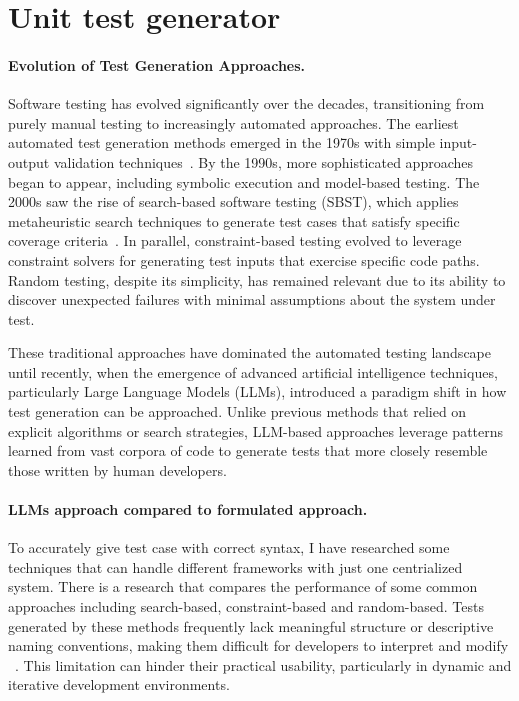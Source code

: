
\section{Unit test generator}

\paragraph{Evolution of Test Generation Approaches.} Software testing has evolved significantly over the decades, transitioning from purely manual testing to increasingly automated approaches. The earliest automated test generation methods emerged in the 1970s with simple input-output validation techniques~\cite{TestHistory}. By the 1990s, more sophisticated approaches began to appear, including symbolic execution and model-based testing. The 2000s saw the rise of search-based software testing (SBST), which applies metaheuristic search techniques to generate test cases that satisfy specific coverage criteria~\cite{SearchBasedSurvey}. In parallel, constraint-based testing evolved to leverage constraint solvers for generating test inputs that exercise specific code paths. Random testing, despite its simplicity, has remained relevant due to its ability to discover unexpected failures with minimal assumptions about the system under test.

\hspace{0.5cm} These traditional approaches have dominated the automated testing landscape until recently, when the emergence of advanced artificial intelligence techniques, particularly Large Language Models (LLMs), introduced a paradigm shift in how test generation can be approached. Unlike previous methods that relied on explicit algorithms or search strategies, LLM-based approaches leverage patterns learned from vast corpora of code to generate tests that more closely resemble those written by human developers.

\paragraph{LLMs approach compared to formulated approach.} To accurately give test case with correct syntax, I have researched some techniques that can handle different frameworks with just one centrialized system. There is a research that compares the performance of some common approaches including search-based, constraint-based and random-based. Tests generated by these methods frequently lack meaningful structure or descriptive naming conventions, making them difficult for developers to interpret and modify ~\cite{UnitTest}. This limitation can hinder their practical usability, particularly in dynamic and iterative development environments.

